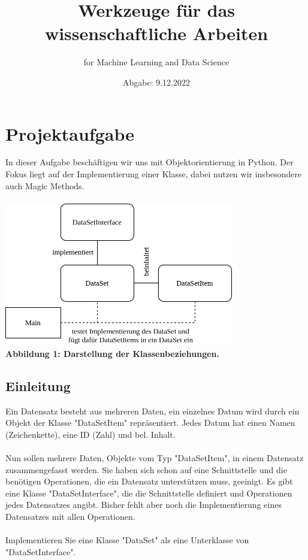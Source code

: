 \documentclass{article}
\begin{document}
	\title{Werkzeuge für das wissenschaftliche Arbeiten}
	\author{for Machine Learning and Data Science}
	\date{Abgabe: 9.12.2022}
	\maketitle
	
	\tableofcontents
	
	\section{Projektaufgabe}
		In dieser Aufgabe beschäftigen wir uns mit Objektorientierung in Python.
		Der Fokus liegt auf der Implementierung einer Klasse, dabei nutzen wir insbesondere auch Magic Methods.\\
		\\
		
		\hspace*{2cm}\includegraphics[width=10cm]{./../diagram/classes_files.png}\\
		\hspace*{3cm}\scriptsize\bf Abbildung 1: \normalfont Darstellung der Klassenbeziehungen.\normalsize\\

		\subsection{Einleitung}
			Ein Datensatz besteht aus mehreren Daten, ein einzelnes Datum wird durch ein Objekt der Klasse "DataSetItem" repräsentiert.
			Jedes Datum hat einen Namen (Zeichenkette), eine ID (Zahl) und bel. Inhalt.\\
			\\
			Nun sollen mehrere Daten, Objekte vom Typ "DataSetItem", in einem Datensatz zusammengefasst werden.
			Sie haben sich schon auf eine Schnittstelle und die benötigen Operationen, die ein Datensatz unterstützen muss, geeinigt.
			Es gibt eine Klasse "DataSetInterface", die die Schnittstelle definiert und Operationen jedes Datensatzes angibt.
			Bisher fehlt aber noch die Implementierung eines Datensatzes mit allen Operationen.\\
			\\
			Implementieren Sie eine Klasse "DataSet" als eine Unterklasse von "DataSetInterface".\\
			\\
	
\end{document}
